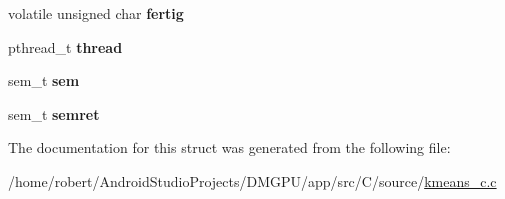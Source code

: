 \begin{DoxyCompactItemize}
\item 
\mbox{\label{structkmeans__pt_ad2580bc7fb5eac708522af779db2d54c}} 
volatile unsigned char {\bfseries fertig}
\item 
\mbox{\label{structkmeans__pt_a2648d7c598e20fdf23e9d30f43b4b17c}} 
pthread\+\_\+t {\bfseries thread}
\item 
\mbox{\label{structkmeans__pt_af1c42a889c6180d899cb41066d2884c0}} 
sem\+\_\+t {\bfseries sem}
\item 
\mbox{\label{structkmeans__pt_aa959612fc7e6fa42798130bbf1c437a7}} 
sem\+\_\+t {\bfseries semret}
\end{DoxyCompactItemize}


The documentation for this struct was generated from the following file\+:\begin{DoxyCompactItemize}
\item 
/home/robert/\+Android\+Studio\+Projects/\+D\+M\+G\+P\+U/app/src/\+C/source/\mbox{\hyperlink{kmeans__c_8c}{kmeans\+\_\+c.\+c}}\end{DoxyCompactItemize}
